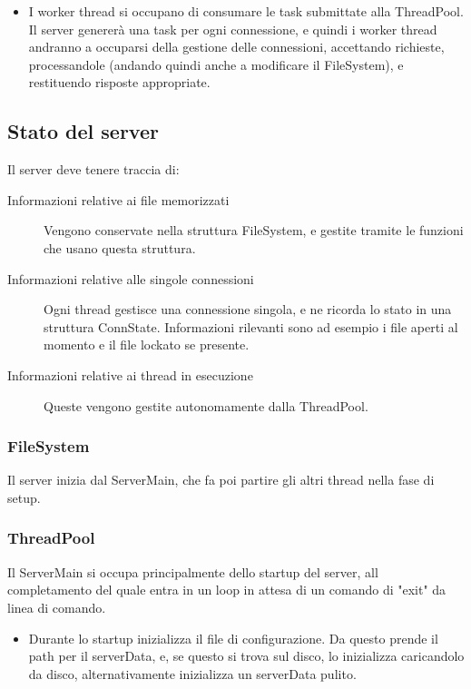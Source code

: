 \documentclass[11pt]{article}
\begin{document}
\begin{flushleft}
\begin{itemize}
\item 
I worker thread si occupano di consumare le task submittate alla ThreadPool. Il server genererà una task per ogni connessione, e quindi i worker thread andranno a occuparsi della gestione delle connessioni, accettando richieste, processandole (andando quindi anche a modificare il FileSystem), e restituendo risposte appropriate.

\end{itemize}

\subsection{Stato del server}
Il server deve tenere traccia di:
\begin{description}

\item[Informazioni relative ai file memorizzati] Vengono conservate nella struttura FileSystem, e gestite tramite le funzioni che usano questa struttura.

\item[Informazioni relative alle singole connessioni] Ogni thread gestisce una connessione singola, e ne ricorda lo stato in una struttura ConnState. Informazioni rilevanti sono ad esempio i file aperti al momento e il file lockato se presente.

\item[Informazioni relative ai thread in esecuzione] Queste vengono gestite autonomamente dalla ThreadPool.

\end{description}


\subsubsection{FileSystem}

Il server inizia dal ServerMain, che fa poi partire gli altri thread nella fase di setup.

\subsubsection{ThreadPool}

Il ServerMain si occupa principalmente dello startup del server, all completamento del quale entra in un loop in attesa di un comando di "exit" da linea di comando. 

\begin{itemize}

\item
Durante lo startup inizializza il file di configurazione. Da questo prende il path per il serverData, e, se questo si trova sul disco, lo inizializza caricandolo da disco, alternativamente inizializza un serverData pulito.


\end{itemize}
\end{flushleft}
\end{document}
